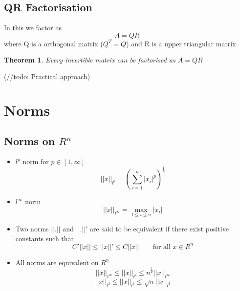 \documentclass{article}
\newtheorem*{theorem}{Theorem}
\begin{document}
	\subsection{QR Factorisation}
		In this we factor as 
		\[A = QR\]
		where Q is a orthogonal matrix ($Q^T = Q$) and R is a upper triangular matrix

		\begin{theorem}
			Every invertible matrix can be factorised as $A= QR$
		\end{theorem}
	(//todo: Practical approach)

\section{Norms}

\subsection{Norms on $R^n$}
	\begin{itemize}
	\item $l^p$ norm for $p \in [1,\infty]$
		\[||x||_{l^p} = (\sum_{i=1}^n|x_i|^p)^{\frac{1}{p}} \]
	\item $l^\infty$ norm 
		\[||x||_{l^\infty} = \max_{1\leq i\leq n} |x_i|\]
	\item Two norms $||.||$ and $||.||'$ are said to be equivalent if there exist positive constants such that
	\[C' ||x|| \leq ||x||' \leq C ||x|| \qquad \text{for all }x\in R^n\]

	\item All norms are equivalent on $R^n$
	\[||x||_{l^\infty} \leq ||x||_{l^p} \leq n^\frac{1}{p} ||x||_{l^\infty} \]
	\[||x||_{l^2} \leq ||x||_{l^1} \leq \sqrt{n}||x||_{l^2} \]

	\end{itemize}
\end{document}
